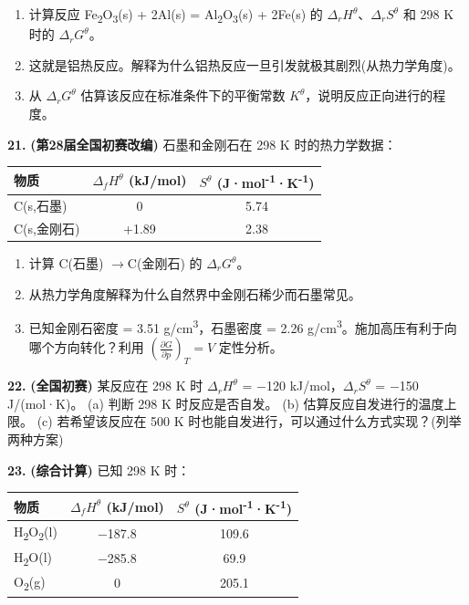\documentclass[a4paper,11pt]{ctexart}
\providecommand{\tightlist}{\setlength{\itemsep}{0pt}\setlength{\parskip}{0pt}}
\newcounter{none}
\newcommand{\箭}{\ensuremath{\rightarrow}}
\newcommand{\左箭}{\ensuremath{\leftarrow}}
\newcommand{\上箭}{\ensuremath{\uparrow}}
\newcommand{\下箭}{\ensuremath{\downarrow}}
\newcommand{\衡}{\ensuremath{\rightleftharpoons}}
\newcommand{\双箭}{\ensuremath{\leftrightarrow}}
\newcommand{\约等于}{\ensuremath{\approx}}
\newcommand{\小于等于}{\ensuremath{\leq}}
\newcommand{\大于等于}{\ensuremath{\geq}}
\newcommand{\不等于}{\ensuremath{\neq}}
\newcommand{\西格马}{\ensuremath{\sigma}}
\newcommand{\派}{\ensuremath{\pi}}
\begin{document}
\begin{enumerate}
\def\labelenumi{(\alph{enumi})}
\tightlist
\item
  计算反应 Fe\textsubscript{2}O\textsubscript{3}(s) + 2Al(s) = Al\textsubscript{2}O\textsubscript{3}(s) + 2Fe(s) 的 \(\Delta_r H^\theta\)、\(\Delta_r S^\theta\) 和 298 K 时的 \(\Delta_r G^\theta\)。
\item
  这就是铝热反应。解释为什么铝热反应一旦引发就极其剧烈(从热力学角度)。
\item
  从 \(\Delta_r G^\theta\) 估算该反应在标准条件下的平衡常数 \(K^\theta\)，说明反应正向进行的程度。
\end{enumerate}

\textbf{21.} \textbf{(第28届全国初赛改编)} 石墨和金刚石在 298 K 时的热力学数据：

{\def\LTcaptype{none} %
\begin{longtable}[]{@{}lcc@{}}
\toprule\noalign{}
物质 & \(\Delta_f H^\theta\) (kJ/mol) & \(S^\theta\) (J·mol\textsuperscript{-1}·K\textsuperscript{-1}) \\
\midrule\noalign{}
\endhead
\bottomrule\noalign{}
\endlastfoot
C(s,石墨) & 0 & 5.74 \\
C(s,金刚石) & +1.89 & 2.38 \\
\end{longtable}
}

\begin{enumerate}
\def\labelenumi{(\alph{enumi})}
\tightlist
\item
  计算 C(石墨) \箭 C(金刚石) 的 \(\Delta_r G^\theta\)。
\item
  从热力学角度解释为什么自然界中金刚石稀少而石墨常见。
\item
  已知金刚石密度 = 3.51 g/cm\textsuperscript{3}，石墨密度 = 2.26 g/cm\textsuperscript{3}。施加高压有利于向哪个方向转化？利用 \(\left(\frac{\partial G}{\partial p}\right)_T = V\) 定性分析。
\end{enumerate}

\textbf{22.} \textbf{(全国初赛)} 某反应在 298 K 时 \(\Delta_r H^\theta\) = −120 kJ/mol，\(\Delta_r S^\theta\) = −150 J/(mol·K)。
(a) 判断 298 K 时反应是否自发。
(b) 估算反应自发进行的温度上限。
(c) 若希望该反应在 500 K 时也能自发进行，可以通过什么方式实现？(列举两种方案)

\textbf{23.} \textbf{(综合计算)} 已知 298 K 时：

{\def\LTcaptype{none} %
\begin{longtable}[]{@{}lcc@{}}
\toprule\noalign{}
物质 & \(\Delta_f H^\theta\) (kJ/mol) & \(S^\theta\) (J·mol\textsuperscript{-1}·K\textsuperscript{-1}) \\
\midrule\noalign{}
\endhead
\bottomrule\noalign{}
\endlastfoot
H\textsubscript{2}O\textsubscript{2}(l) & −187.8 & 109.6 \\
H\textsubscript{2}O(l) & −285.8 & 69.9 \\
O\textsubscript{2}(g) & 0 & 205.1 \\
\end{longtable}
}
\end{document}
